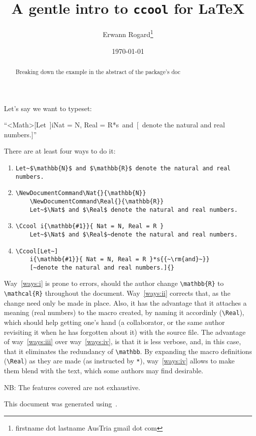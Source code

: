 \documentclass{article}
\title{A gentle intro to \texttt{ccool} for \LaTeX}
\author{Erwann Rogard\thanks{firstname dot lastname AusTria gmail dot com}}
\date{\today}
\providecommand\docways[1]{way~\ref{ways:#1}}
\providecommand\docWays[1]{Way~\ref{ways:#1}}
\begin{document}
\maketitle

\begin{abstract}
  Breaking down the example in the abstract of the package's doc\cite{ccool}
\end{abstract}


Let's say we want to typeset:
\begin{center}
  ``\Ccool<Math>[Let~]i{}{Nat = N, Real = R}*s{{~\rm{and}~}}[~denote the natural and real numbers.]{}''
\end{center}

There are at least four ways to do it:
\begin{enumerate}[label=\emph{\roman*)}]
\item \label{ways:i}
  \begin{Verbatim}[breaklines=true]
    Let~$\mathbb{N}$ and $\mathbb{R}$ denote the natural and real numbers.
  \end{Verbatim}
\item   \label{ways:ii}
  \begin{Verbatim}[breaklines=true]
    \NewDocumentCommand\Nat{}{\mathbb{N}}
    \NewDocumentCommand\Real{}{\mathbb{R}}
    Let~$\Nat$ and $\Real$ denote the natural and real numbers.
  \end{Verbatim}

\item  \label{ways:iii}
  \begin{Verbatim}[breaklines=true]
    \Ccool i{\mathbb{#1}}{ Nat = N, Real = R }
    Let~$\Nat$ and $\Real$~denote the natural and real numbers.
  \end{Verbatim}

\item  \label{ways:iv}
  \begin{Verbatim}[breaklines=true]
    \Ccool[Let~]
    i{\mathbb{#1}}{ Nat = N, Real = R }*s{{~\rm{and}~}}
    [~denote the natural and real numbers.]{}
  \end{Verbatim}
\end{enumerate}

\docWays{i} is prone to errors, should the author change \verb+\mathbb{R}+ to \verb+\mathcal{R}+ throughout the document.
\docWays{ii} corrects that, as the change need only be made in place.
Also, it has the advantage that it attaches a meaning (real numbers) to the macro created,
by naming it accordinly (\verb|\Real|), which should help getting one's hand (a collaborator,
or the same author revisiting it when he has forgotten about it) with the source file.
The advantage of \docways{iii} over  \docways{iv}, is that it is less verbose,
and, in this case, that it eliminates the redundancy of \verb|\mathbb|.
By expanding the macro definitions (\verb+\Real+) as they are made (as instructed by \verb+*+), \docways{iv} allows to
make them blend with the text, which some authors may find desirable.

NB: The features covered are not exhaustive.

This document was generated using~\CcoolVers.

{}
\printbibliography[heading=subbibliography]
\end{document}

